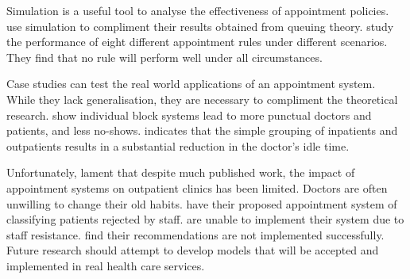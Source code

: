 Simulation is a useful tool to analyse the effectiveness of appointment policies. \citet{Kao} use simulation to compliment their results obtained from queuing theory. \citet{Ho} study the performance of eight different appointment rules under different scenarios. They find that no rule will perform well under all circumstances.

Case studies can test the real world applications of an appointment system. While they lack generalisation, they are necessary to compliment the theoretical research. \citet{Rockart} show individual block systems lead to more punctual doctors and patients, and less no-shows. \citet{Walter} indicates that the simple grouping of inpatients and outpatients results in a substantial reduction in the doctor's idle time.

Unfortunately, \citet{Cayirli} lament that despite much published work, the impact of appointment systems on outpatient clinics has been limited. Doctors are often unwilling to change their old habits. \citet{O'Keefe} have their proposed appointment system of classifying patients rejected by staff. \citet{Huarng} are unable to implement their system due to staff resistance. \citet{Bennett} find their recommendations are not implemented successfully. Future research should attempt to develop models that will be accepted and implemented in real health care services.
